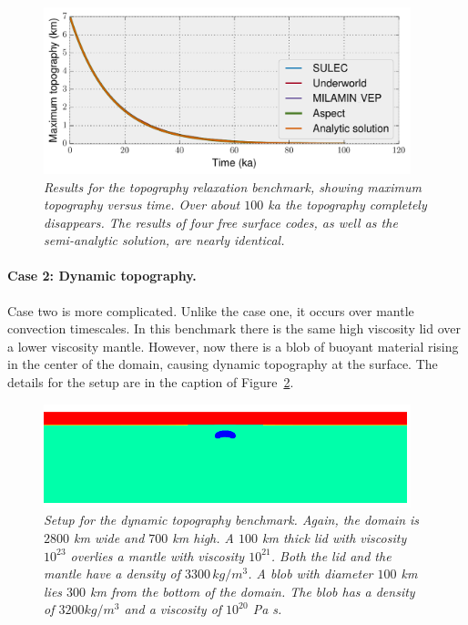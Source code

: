\documentclass{article}
\begin{document}
\begin{figure}
  \begin{center}
    \includegraphics[width=0.95\textwidth]{cookbooks/benchmarks/crameri/crameri_1_comparison.pdf}
  \end{center}
  \caption{\it Results for the topography relaxation benchmark, showing maximum topography 
   versus time. Over about $100$ ka the topography completely disappears. The results of four 
   free surface codes, as well as the semi-analytic solution, are nearly identical.}
  \label{fig:crameri-benchmark-relaxation-topography}
\end{figure}

\paragraph{Case 2: Dynamic topography.}
\label{sec:benchmark-crameri-case-2}

Case two is more complicated. Unlike the case one, it occurs over mantle convection 
timescales.  In this benchmark there is the same high viscosity lid over a lower 
viscosity mantle. However, now there is a blob of buoyant material rising in the 
center of the domain, causing dynamic topography at the surface. The details for the setup
are in the caption of Figure~\ref{fig:crameri-benchmark-rising-blob}.

\begin{figure}
  \begin{center}
    \includegraphics[width=0.95\textwidth]{cookbooks/benchmarks/crameri/rising_blob.png}
  \end{center}
  \caption{\it Setup for the dynamic topography benchmark. Again, the domain is $2800$ km 
  wide and $700$ km high.  A $100$ km thick lid with viscosity $10^{23}$ overlies a mantle
  with viscosity $10^{21}$.  Both the lid and the mantle have a density of $3300\,kg/m^3$.
  A blob with diameter $100$ km lies $300$ km from the bottom of the domain.  The blob has 
  a density of $3200 kg/m^3$ and a viscosity of $10^{20}$ Pa s.}
  \label{fig:crameri-benchmark-rising-blob}
\end{figure}
\end{document}
